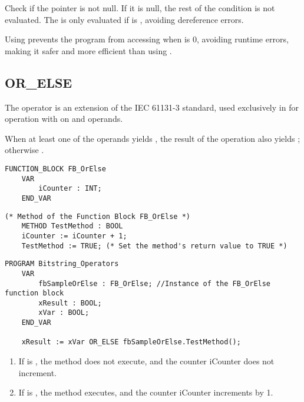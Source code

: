 	Check if the pointer  is not null. If it is null, the rest of the condition is not evaluated.
	 The  is only evaluated if  is , avoiding dereference errors.

Using  prevents the program from accessing  when  is 0, avoiding runtime errors, making it safer and more efficient than using .
\subsection{OR\_ELSE} 
The operator is an extension of the IEC 61131-3 standard, used
exclusively in  for  operation with 
on  and  operands.

When at least one of the operands yields , the result of the operation also yields ; otherwise .

\begin{lstlisting}[language=ST ]
	FUNCTION_BLOCK FB_OrElse
	VAR
		iCounter : INT;
	END_VAR
\end{lstlisting}
 
\newpage
\begin{lstlisting}[language=ST ]	
	(* Method of the Function Block FB_OrElse *)
	METHOD TestMethod : BOOL
	iCounter := iCounter + 1;
	TestMethod := TRUE; (* Set the method's return value to TRUE *)
\end{lstlisting} 

\begin{lstlisting}[language=ST ]
	PROGRAM Bitstring_Operators
	VAR 
		fbSampleOrElse : FB_OrElse; //Instance of the FB_OrElse function block 
		xResult : BOOL;
		xVar : BOOL;
	END_VAR
	
	xResult := xVar OR_ELSE fbSampleOrElse.TestMethod();
\end{lstlisting} 

\begin{enumerate}
	\item If  is , the method does not execute, and the counter iCounter does not increment.
	\item If  is , the method executes, and the counter iCounter increments by 1.
\end{enumerate}

